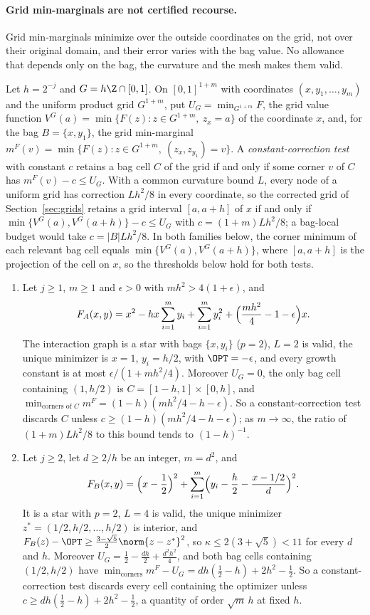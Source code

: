 \paragraph{Grid min-marginals are not certified recourse.}
Grid min-marginals minimize over the outside coordinates on the grid, not
over their original domain, and their error varies with the bag value. No
allowance that depends only on the bag, the curvature and the mesh makes
them valid.

Let $h=2^{-j}$ and $G=h\Z\cap[0,1]$. On $[0,1]^{1+m}$ with coordinates
$(x,y_1,\ldots,y_m)$ and the uniform product grid $G^{1+m}$, put
$U_G=\min_{G^{1+m}}F$, the grid value function
$V^G(a)=\min\{F(z):z\in G^{1+m},\ z_x=a\}$ of the coordinate $x$, and, for the
bag $B=\{x,y_1\}$, the grid min-marginal
$m^F(v)=\min\{F(z):z\in G^{1+m},\ (z_x,z_{y_1})=v\}$. A
\emph{constant-correction test} with constant $c$ retains a bag cell $C$ of
the grid if and only if some corner $v$ of $C$ has $m^F(v)-c\le U_G$. With a
common curvature bound $L$, every node of a uniform grid has correction
$Lh^2/8$ in every coordinate, so the corrected grid of
Section~\ref{sec:grids} retains a grid interval $[a,a+h]$ of $x$ if and only
if $\min\{V^G(a),V^G(a+h)\}-c\le U_G$ with $c=(1+m)Lh^2/8$; a bag-local
budget would take $c=|B|Lh^2/8$. In both families below, the corner minimum
of each relevant bag cell equals $\min\{V^G(a),V^G(a+h)\}$, where $[a,a+h]$
is the projection of the cell on $x$, so the thresholds below hold for both
tests.

\begin{proposition}\label{prop:star}
\leavevmode
\begin{enumerate}
\item[(A)] Let $j\ge1$, $m\ge1$ and $\epsilon>0$ with $mh^2>4(1+\epsilon)$,
and
\[
F_A(x,y)=x^2-hx\sum_{i=1}^my_i+\sum_{i=1}^my_i^2
+\Bigl(\frac{mh^2}4-1-\epsilon\Bigr)x .
\]
The interaction graph is a star with bags $\{x,y_i\}$ ($p=2$), $L=2$ is
valid, the unique minimizer is $x=1$, $y_i=h/2$, with $\OPT=-\epsilon$, and
every growth constant is at most $\epsilon/(1+mh^2/4)$. Moreover $U_G=0$,
the only bag cell containing $(1,h/2)$ is $C=[1-h,1]\times[0,h]$, and
$\min_{\text{corners of }C}m^F=(1-h)(mh^2/4-h-\epsilon)$. So a
constant-correction test discards $C$ unless
$c\ge(1-h)(mh^2/4-h-\epsilon)$; as $m\to\infty$, the ratio of
$(1+m)Lh^2/8$ to this bound tends to $(1-h)^{-1}$.
\item[(B)] Let $j\ge2$, let $d\ge2/h$ be an integer, $m=d^2$, and
\[
F_B(x,y)=\Bigl(x-\frac12\Bigr)^2+\sum_{i=1}^m
\Bigl(y_i-\frac h2-\frac{x-1/2}{d}\Bigr)^2 .
\]
It is a star with $p=2$, $L=4$ is valid, the unique minimizer
$z^*=(1/2,h/2,\ldots,h/2)$ is interior, and
$F_B(z)-\OPT\ge\frac{3-\sqrt5}2\norm{z-z^*}^2$, so $\kappa\le2(3+\sqrt5)<11$
for every $d$ and $h$. Moreover $U_G=\frac12-\frac{dh}2+\frac{d^2h^2}4$, and
both bag cells containing $(1/2,h/2)$ have
$\min_{\text{corners}}m^F-U_G=dh(\frac12-h)+2h^2-\frac12$. So a
constant-correction test discards every cell containing the optimizer
unless $c\ge dh(\frac12-h)+2h^2-\frac12$, a quantity of order $\sqrt m\,h$
at fixed $h$.
\end{enumerate}
\end{proposition}

